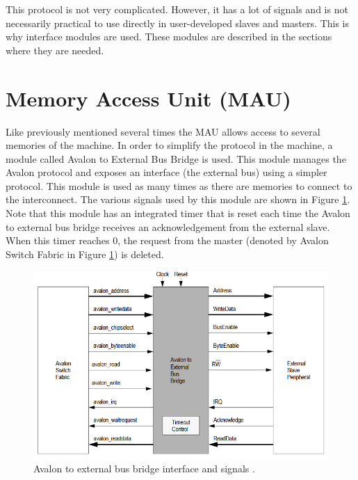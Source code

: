 This protocol is not very complicated. However, it has a lot of signals and is not necessarily 
practical to use directly in user-developed slaves and masters. This is why interface modules are 
used. These modules are described in the sections where they are needed.

\section{Memory Access Unit (MAU)}

Like previously mentioned several times the MAU allows access to several memories of the machine. In order 
to simplify the protocol in the machine, a module called Avalon to External Bus Bridge is used. This 
module manages the Avalon protocol and exposes an interface (the external bus) using a simpler 
protocol. This module is used as many times as there are memories to connect to the interconnect.
The various signals used by this module are shown in Figure \ref{fig:mau/bus_bridge}. Note that this
module has an integrated timer that is reset each time the Avalon to external bus bridge receives
an acknowledgement from the external slave. When this timer reaches 0, the request from the master 
(denoted by Avalon Switch Fabric in Figure \ref{fig:mau/bus_bridge}) is deleted.

\begin{figure}[ht!]
    \center
    \includegraphics[scale=0.8]{"Chapter5-MAU_CTRLU/res/external_bus_bridge.PNG"}
    \caption{Avalon to external bus bridge interface and signals \cite{bus}.}
    \label{fig:mau/bus_bridge}
\end{figure}

